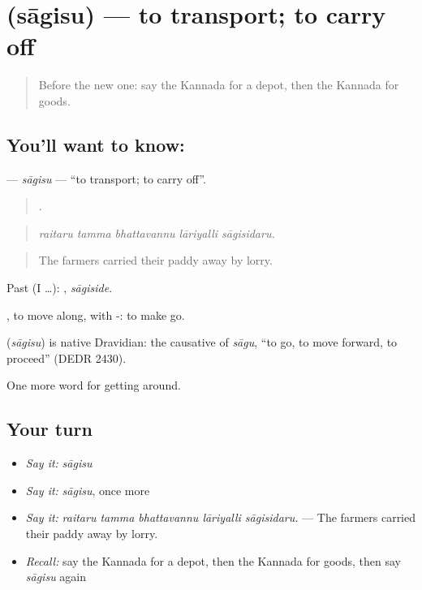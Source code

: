 \section[\texorpdfstring{\kn{ಸಾಗಿಸು} (sāgisu)}{ಸಾಗಿಸು (sāgisu)}]{ (sāgisu) — to transport; to carry off}

\label{lesson:KA-C452-sagisu}



\begin{quote}
Before the new one: say the Kannada for a depot, then the Kannada for goods.
\end{quote}

\subsection*{You'll want to know: }
\textbf{} — \emph{sāgisu} — \textquotedblleft{}to transport; to carry off\textquotedblright{}.

\begin{quote}
    .
\end{quote}

\begin{quote}
\emph{raitaru tamma bhattavannu lāriyalli sāgisidaru.}
\end{quote}

\begin{quote}
The farmers carried their paddy away by lorry.
\end{quote}

Past (I …): , \emph{sāgiside}.

, to move along, with -: to make go.

\begin{cousinweb}
\textbf{} (\emph{sāgisu}) is native Dravidian: the causative of \emph{sāgu}, \textquotedblleft{}to go, to move forward, to proceed\textquotedblright{} (DEDR 2430).
\end{cousinweb}

\begin{grammarlens}[title={What you've built}]
One more word for getting around.
\end{grammarlens}

\subsection*{Your turn}
\begin{itemize}
\raggedright
  \item \emph{Say it:} \emph{sāgisu}
  \item \emph{Say it:} \emph{sāgisu}, once more
  \item \emph{Say it:} \emph{raitaru tamma bhattavannu lāriyalli sāgisidaru.} — The farmers carried their paddy away by lorry.
  \item \emph{Recall:} say the Kannada for a depot, then the Kannada for goods, then say \emph{sāgisu} again
\end{itemize}

